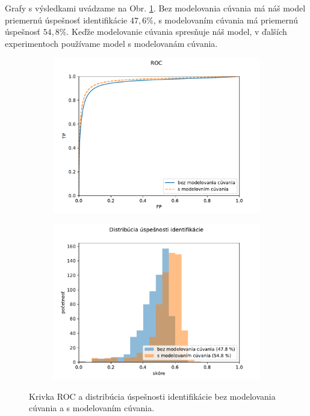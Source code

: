 Grafy s výsledkami uvádzame na Obr. \ref{fig:grafy_flashbacks}. Bez modelovania cúvania má náš model priemernú úspešnosť
identifikácie $47,6 \%$, s modelovaním cúvania má priemernú úspešnosť $54,8 \%$.
Keďže modelovanie cúvania spresňuje náš model, v ďalších experimentoch používame model s modelovanám
cúvania.

\begin{figure}[t]
\begin{subfigure}{0.5\textwidth}
\centerline{\includegraphics[width=\linewidth]{plots/3_ROC}}
\end{subfigure}%
\begin{subfigure}{0.5\textwidth}
\centerline{\includegraphics[width=\linewidth]{plots/3_uspesnost_eqbins}}
\end{subfigure}
\caption{Krivka ROC a distribúcia úspešnosti identifikácie bez modelovania cúvania a s modelovaním cúvania.}
\label{fig:grafy_flashbacks}
\end{figure}

